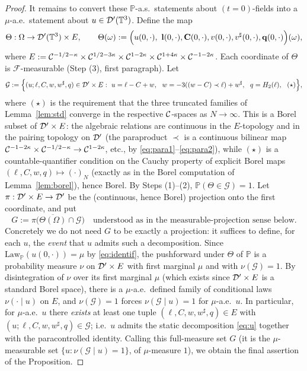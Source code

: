 \begin{proof}
It remains to convert these $\mathbb P$-a.s.\ statements about $(t=0)$-fields into
a $\mu$-a.e.\ statement about $u\in\mathcal{D}'(\mathbb{T}^3)$. Define the map
\[
\Theta:\Omega\to \qoneD'(\qoneT^3)\times E,\qquad
\Theta(\omega):=\Bigl(u(0,\cdot),\ \qoneLin(0,\cdot),\qoneIqc(0,\cdot),v(0,\cdot),v^\sharp(0,\cdot),\qoneLsq(0,\cdot)\Bigr)(\omega),
\]
where $E:=\mathcal{C}^{-1/2-\kappa}\times\mathcal{C}^{1/2-3\kappa}\times\mathcal{C}^{1-2\kappa}\times
\mathcal{C}^{1+4\kappa}\times\mathcal{C}^{-1-2\kappa}$. Each coordinate of $\Theta$ is
$\mathcal F$-measurable (Step (3), first paragraph). Let
\[
\mathcal G:=\Bigl\{(u;\ell,C,w,w^\sharp,q)\in\qoneD'\times E:\ u=\ell-C+w,\ \ w=-3((w-C)\prec\ell)+w^\sharp,\ \ q=\qoneHp_2(\ell),\ \ (\star)\Bigr\},
\]
where $(\star)$ is the requirement that the three truncated families of
Lemma~\ref{lem:std} converge in the respective $\mathcal{C}$-spaces as $N\to\infty$.
This is a Borel subset of $\mathcal{D}'\times E$: the algebraic relations are continuous
in the $E$-topology and in the pairing topology on $\mathcal{D}'$ (the paraproduct
$\prec$ is a continuous bilinear map $\mathcal{C}^{-1-2\kappa}\times\mathcal{C}^{-1/2-\kappa}\to
\mathcal{C}^{1-2\kappa}$, etc., by \eqref{eq:para1}--\eqref{eq:para2}), while $(\star)$ is
a countable-quantifier condition on the Cauchy property of explicit Borel maps
$(\ell,C,w,q)\mapsto(\cdot)_N$ (exactly as in the Borel computation of
Lemma~\ref{lem:borel}), hence Borel. By Steps (1)--(2),
$\mathbb P(\Theta\in\mathcal G)=1$. Let
$\pi:\mathcal{D}'\times E\to\mathcal{D}'$ be the (continuous, hence Borel) projection onto the
first coordinate, and put
\[
G:=\pi\bigl(\overline{\Theta(\Omega)}\cap\mathcal G\bigr)\quad\text{understood as in the measurable-projection sense below.}
\]
Concretely we do not need $G$ to be exactly a projection: it suffices to define,
for each $u$, the \emph{event} that $u$ admits such a decomposition. Since
$\mathrm{Law}_{\mathbb P}(u(0,\cdot))=\mu$ by \eqref{eq:identif}, the pushforward
under $\Theta$ of $\mathbb P$ is a probability measure $\nu$ on $\mathcal{D}'\times E$ with
first marginal $\mu$ and with $\nu(\mathcal G)=1$. By disintegration of $\nu$ over
its first marginal $\mu$ (which exists since $\mathcal{D}'\times E$ is a standard Borel
space), there is a $\mu$-a.e.\ defined family of conditional laws
$\nu(\cdot\mid u)$ on $E$, and $\nu(\mathcal G)=1$ forces
$\nu(\mathcal G\mid u)=1$ for $\mu$-a.e.\ $u$. In particular, for $\mu$-a.e.\ $u$
there \emph{exists} at least one tuple $(\ell,C,w,w^\sharp,q)\in E$ with
$(u;\ell,C,w,w^\sharp,q)\in\mathcal G$; i.e.\ $u$ admits the static decomposition
\eqref{eq:u} together with the paracontrolled identity. Calling this full-measure
set $G$ (it is the $\mu$-measurable set
$\{u:\nu(\mathcal G\mid u)=1\}$, of $\mu$-measure $1$), we obtain the final
assertion of the Proposition.
\end{proof}


